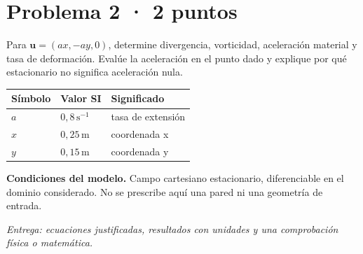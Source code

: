 \par\medskip\noindent\begin{minipage}{\linewidth}

\section{Problema 2 · 2 puntos}

Para $\boldsymbol u=(ax,-ay,0)$, determine divergencia, vorticidad, aceleración material y tasa de deformación. Evalúe la aceleración en el punto dado y explique por qué estacionario no significa aceleración nula.

\begin{tabular}{@{}p{.15\linewidth}p{.23\linewidth}p{.54\linewidth}@{}}
\toprule Símbolo & Valor SI & Significado\\\midrule
$a$ & $0{,}8\,\mathrm{s^{-1}}$ & tasa de extensión\\
$x$ & $0{,}25\,\mathrm{m}$ & coordenada x\\
$y$ & $0{,}15\,\mathrm{m}$ & coordenada y\\
\bottomrule\end{tabular}

\par\medskip\textbf{Condiciones del modelo.} Campo cartesiano estacionario, diferenciable en el dominio considerado. No se prescribe aquí una pared ni una geometría de entrada.

\par\textit{Entrega: ecuaciones justificadas, resultados con unidades y una comprobación física o matemática.}

\end{minipage}\par\medskip

